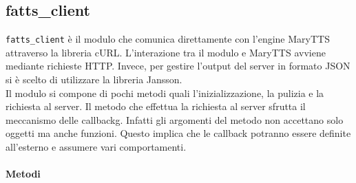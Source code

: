 \subsection{fatts\_client}
\texttt{fatts\_client} è il modulo che comunica direttamente con l'engine MaryTTS attraverso la libreria cURL. L'interazione tra il modulo e MaryTTS avviene mediante richieste HTTP. Invece, per gestire l'output del server in formato JSON si è scelto di utilizzare la libreria Jansson.\\ 
Il modulo si compone di pochi metodi quali l'inizializzazione, la pulizia e la richiesta al server.
Il metodo che effettua la richiesta al server sfrutta il meccanismo delle \gls{callbackg}. Infatti gli argomenti del metodo non accettano solo oggetti ma anche funzioni. Questo implica che le callback potranno essere definite all'esterno e assumere vari comportamenti.
\\\\
\textbf{Metodi}

